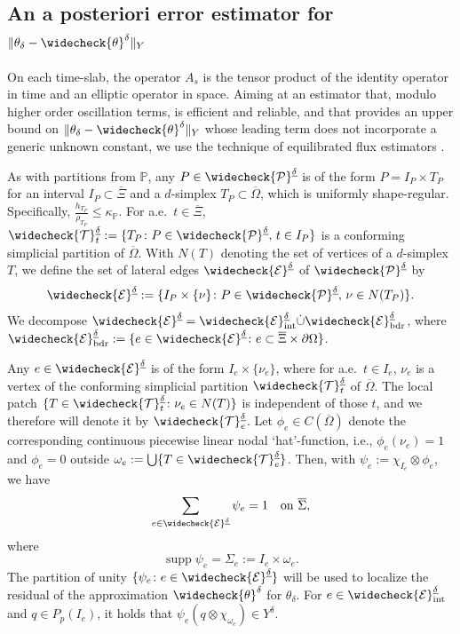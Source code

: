 \documentclass{amsart}
\numberwithin{equation}{section}
\newcommand{\cE}{\mathcal E}
\DeclareMathOperator{\supp}{supp}
\newcommand{\1}{\mathbb 1}
\newcommand{\be}{\begin{equation}}
\newcommand{\ee}{\end{equation}}
\newcommand{\bbP}{\mathbb{P}}
\newcommand{\tria}{{\mathcal T}}
\newcommand{\pria}{{\mathcal P}}
\begin{document}
\subsection{An a posteriori error estimator for $\|\theta_\delta-\widecheck{\theta}^\delta\|_Y$}
On each time-slab, the operator $A_s$ is the tensor product of the identity operator in time and an elliptic operator in space.
Aiming at an estimator that, modulo higher order oscillation terms, is efficient and reliable, and that provides an upper bound on  $\|\theta_\delta-\widecheck{\theta}^\delta\|_Y$ whose leading term does not incorporate a generic unknown constant, we use the technique of equilibrated flux estimators \cite{33,70.8,58.95}.

As with partitions from $\bbP$, any $P \in \widecheck{\pria}^{\underline{\delta}}$ is of the form $P=I_P \times T_P$ for an interval $I_P \subset \overline{\Xi}$ and a $d$-simplex $T_P \subset \overline{\Omega}$, which is uniformly shape-regular. Specifically, $\frac{h_{T_P}}{\rho_{T_P}} \leq \kappa_\bbP$.
For a.e.~$t \in \overline{\Xi}$, $\widecheck{\tria}_t^{\underline\delta}:= \{T_P \colon P \in \widecheck{\pria}^{\underline\delta},\,t \in I_P\}$ is a conforming simplicial partition of $\overline{\Omega}$.
With $N(T)$ denoting the set of vertices of a $d$-simplex $T$, we define the set of lateral edges $\widecheck{\cE}^{\underline{\delta}}$ of $\widecheck{\pria}^{\underline{\delta}}$ by
$$
\widecheck{\cE}^{\underline{\delta}} := \{I_P \times \{\nu\} \colon P \in \widecheck{\pria}^{\underline{\delta}},\,\nu \in N(T_P)\}.
$$
We decompose $\widecheck{\cE}^{\underline{\delta}} = \widecheck{\cE}_{\text{int}}^{\underline{\delta}} \dot\cup \widecheck{\cE}_{\text{bdr}}^{\underline{\delta}}$, where
$\widecheck{\cE}_{\text{bdr}}^{\underline{\delta}}:=\{e \in \widecheck{\cE}^{\underline{\delta}}\colon e \subset \overline{\Xi} \times \partial\Omega\}$.

Any $e\in \widecheck{\cE}^{\underline{\delta}}$ is of the form $I_e \times \{\nu_e\}$, where for a.e.~$t \in I_e$, $\nu_e$ is a vertex of the conforming simplicial partition $\widecheck\tria^{\underline{\delta}}_t$ of $\overline{\Omega}$. 
The local patch $\{T \in \widecheck\tria_t^{\underline{\delta}}\colon \nu_e \in N(T)\}$ is independent of those $t$, 
and we therefore will denote it by $\widecheck\tria^{\underline{\delta}}_e$.
Let $\phi_e \in C(\overline{\Omega})$ denote the corresponding continuous piecewise linear nodal `hat'-function, i.e., $\phi_e(\nu_e)=1$ and $\phi_e=0$ outside $\omega_e:=\bigcup \{T \in \widecheck\tria_e^{\underline{\delta}}\}$.
Then, with $\psi_e:=\chi_{I_e} \otimes \phi_e$,
we have
\be \label{eq:unity}
\sum_{e \in \widecheck{\cE}^{\underline{\delta}}} \psi_e =1\quad \text{on } \overline{\Sigma},
\ee
where
$$
\supp \psi_e = \Sigma_e:=I_e \times \omega_e.
$$
The partition of unity $\{\psi_e\colon e \in \widecheck{\cE}^{\underline{\delta}}\}$ will be used to localize the residual of the approximation $\widecheck{\theta}^\delta$ for $\theta_\delta$.
For $e \in \widecheck{\cE}_{\rm int}^{\underline{\delta}}$ and $q \in P_p(I_e)$, it holds that $\psi_e(q \otimes \chi_{\omega_e}) \in Y^\delta$.
\end{document}
